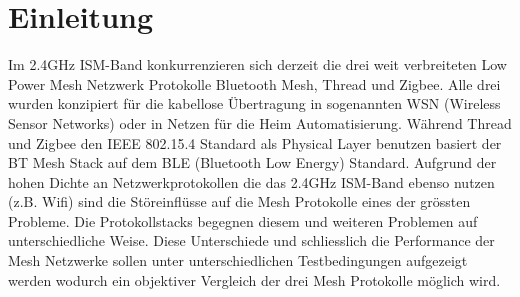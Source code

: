 \newpage
\section{Einleitung}
Im 2.4GHz ISM-Band kon­kur­ren­zie­ren sich derzeit die drei weit verbreiteten Low Power Mesh Netzwerk Protokolle Bluetooth Mesh, Thread und Zigbee.
Alle drei wurden konzipiert für die kabellose Übertragung in sogenannten WSN (Wireless Sensor Networks) oder in Netzen für die Heim Automatisierung. Während Thread und Zigbee den IEEE 802.15.4 Standard als Physical Layer benutzen basiert der BT Mesh Stack auf dem BLE (Bluetooth Low Energy) Standard. Aufgrund der hohen Dichte an Netzwerkprotokollen die das 2.4GHz ISM-Band ebenso nutzen (z.B. Wifi) sind die Störeinflüsse auf die Mesh Protokolle eines der grössten Probleme. Die Protokollstacks begegnen diesem und weiteren Problemen auf unterschiedliche Weise. Diese Unterschiede und schliesslich die Performance der Mesh Netzwerke sollen unter unterschiedlichen Testbedingungen aufgezeigt werden wodurch ein objektiver Vergleich der drei Mesh Protokolle möglich wird.

